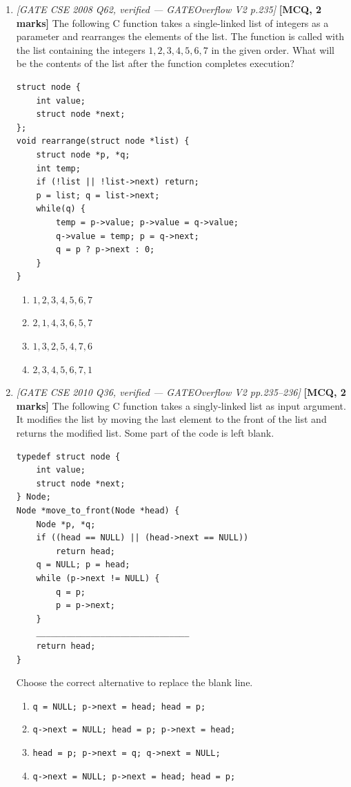 \documentclass[11pt]{article}
\begin{document}
\begin{enumerate}
\item[\textbf{Q4}] \textit{[GATE CSE 2008 Q62, verified --- GATEOverflow V2 p.235]} \textbf{[MCQ, 2 marks]} The following C function takes a single-linked list of integers as a parameter and rearranges the elements of the list. The function is called with the list containing the integers $1, 2, 3, 4, 5, 6, 7$ in the given order. What will be the contents of the list after the function completes execution?
\begin{verbatim}
struct node {
    int value;
    struct node *next;
};
void rearrange(struct node *list) {
    struct node *p, *q;
    int temp;
    if (!list || !list->next) return;
    p = list; q = list->next;
    while(q) {
        temp = p->value; p->value = q->value;
        q->value = temp; p = q->next;
        q = p ? p->next : 0;
    }
}
\end{verbatim}
\begin{enumerate}
  \item[(A)] $1, 2, 3, 4, 5, 6, 7$
  \item[(B)] $2, 1, 4, 3, 6, 5, 7$
  \item[(C)] $1, 3, 2, 5, 4, 7, 6$
  \item[(D)] $2, 3, 4, 5, 6, 7, 1$
\end{enumerate}

\item[\textbf{Q5}] \textit{[GATE CSE 2010 Q36, verified --- GATEOverflow V2 pp.235--236]} \textbf{[MCQ, 2 marks]} The following C function takes a singly-linked list as input argument. It modifies the list by moving the last element to the front of the list and returns the modified list. Some part of the code is left blank.
\begin{verbatim}
typedef struct node {
    int value;
    struct node *next;
} Node;
Node *move_to_front(Node *head) {
    Node *p, *q;
    if ((head == NULL) || (head->next == NULL))
        return head;
    q = NULL; p = head;
    while (p->next != NULL) {
        q = p;
        p = p->next;
    }
    _______________________________
    return head;
}
\end{verbatim}
Choose the correct alternative to replace the blank line.
\begin{enumerate}
  \item[(A)] \texttt{q = NULL; p->next = head; head = p;}
  \item[(B)] \texttt{q->next = NULL; head = p; p->next = head;}
  \item[(C)] \texttt{head = p; p->next = q; q->next = NULL;}
  \item[(D)] \texttt{q->next = NULL; p->next = head; head = p;}
\end{enumerate}


\end{enumerate}
\end{document}
